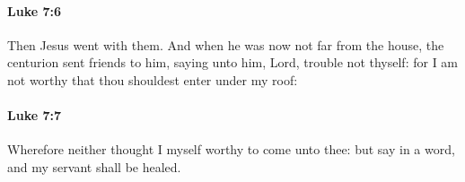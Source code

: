 		\paragraph{Luke 7:6} %
			\label{LUKE-7-6}

			Then Jesus went with them. And when he was now not far from the house, the centurion sent friends to him, saying unto him, Lord, trouble not thyself: for I am not worthy that thou shouldest enter under my roof:

			\begin{framed}
			\scriptsize
				\begin{compactdesc}
					\item[SBLG] 
				\end{compactdesc}
			\end{framed}

		\paragraph{Luke 7:7} %
			\label{LUKE-7-7}

			Wherefore neither thought I myself worthy to come unto thee: but say in a word, and my servant shall be healed.

